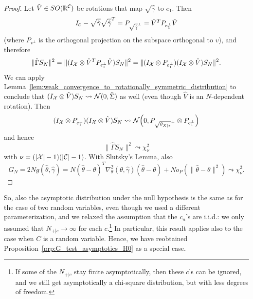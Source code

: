 \begin{proof}
  Let $\hat V \in SO(\mathbb{R}^{\mathcal{C}})$ be rotations that map $\sqrt{\hat\gamma}$ to $e_1$. Then
  $$I_{\mathcal{C}} - \sqrt{\hat\gamma} \sqrt{\hat\gamma}^T = P_{\sqrt{\hat\gamma}^\perp} = \hat V^T P_{e_1^\perp} \hat V$$
  (where $P_{v^\perp}$ is the orthogonal projection on the subspace orthogonal to $v$),
  and therefore
  $$\lVert \hat\Gamma S_N \rVert^2 = \lVert (I_{\mathcal{X}} \otimes \hat V^T P_{e_1^\perp} \hat V) S_N \rVert^2
    = \lVert (I_{\mathcal{X}} \otimes P_{e_1^\perp})(I_{\mathcal{X}} \otimes \hat V) S_N \rVert^2.$$
  We can apply Lemma~\ref{lem:weak_convergence_to_rotationally_symmetric_distribution} to conclude that $(I_{\mathcal{X}} \otimes \hat V) S_N \leadsto \mathcal{N}(0,\tilde\Sigma)$ as well (even though $\hat V$ is an $N$-dependent rotation).
  Then 
  $$(I_{\mathcal{X}} \otimes P_{e_1^\perp})(I_{\mathcal{X}} \otimes \hat V) S_N \leadsto \mathcal{N}\Big(0,P_{\sqrt{\theta_{X|\ast}}^\perp} \otimes P_{e_1^\perp}\Big)$$
  and hence
  $$\lVert \hat\Gamma S_N \rVert^2 \leadsto \chi^2_{\nu}$$
  with $\nu = (|\mathcal{X}|-1)(|\mathcal{C}|-1)$.
  With Slutsky's Lemma, also
  $$G_N = 2N g(\hat\theta,\hat\gamma) = N (\hat\theta - \theta)^T \nabla_\theta^2(\theta,\hat\gamma) (\hat\theta - \theta) + N o_P(\lVert\hat\theta - \theta\rVert^2) \leadsto \chi^2_{\nu}.$$
\end{proof}
So, also the asymptotic distribution under the null hypothesis is the same as for the case of two random variables, 
even though we used a different parameterization,
and we relaxed the assumption that the $c_n$'s are i.i.d.:
we only assumed that $N_{+|c} \to \infty$ for each $c$.\footnote{If some of the $N_{+|c}$ stay finite asymptotically, then these $c$'s can be ignored, and we still get asymptotically a chi-square distribution, but with less degrees of freedom.}
In particular, this result applies also to the case when
$C$ is a random variable. Hence, we have reobtained Proposition~\ref{prp:G_test_asymptotics_H0} as a special case.

